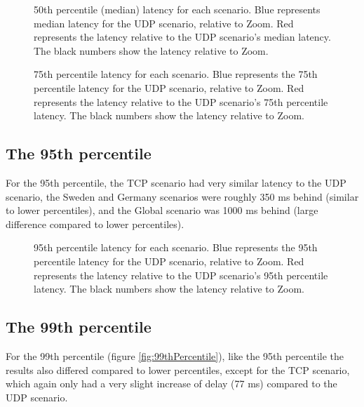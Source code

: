 \documentclass{kththesis}
\begin{document}
\begin{figure}[!htb]
    \centering
    
    \caption{50th percentile (median) latency for each scenario. Blue represents median latency for the UDP scenario, relative to Zoom. Red represents the latency relative to the UDP scenario's median latency. The black numbers show the latency relative to Zoom.}
    \label{fig:50thPercentile}
\end{figure}

\begin{figure}[!htb]
    \centering
    
    \caption{75th percentile latency for each scenario. Blue represents the 75th percentile latency for the UDP scenario, relative to Zoom. Red represents the latency relative to the UDP scenario's 75th percentile latency. The black numbers show the latency relative to Zoom.}
    \label{fig:75thPercentile}
\end{figure}

\subsection{The 95th percentile}
For the 95th percentile, the TCP scenario had very similar latency to the UDP scenario, the Sweden and Germany scenarios were roughly 350 ms behind (similar to lower percentiles), and the Global scenario was 1000 ms behind (large difference compared to lower percentiles).

\begin{figure}[!htb]
    \centering
    
    \caption{95th percentile latency for each scenario. Blue represents the 95th percentile latency for the UDP scenario, relative to Zoom. Red represents the latency relative to the UDP scenario's 95th percentile latency. The black numbers show the latency relative to Zoom.}
    \label{fig:95thPercentile}
\end{figure}

\subsection{The 99th percentile}
For the 99th percentile (figure \ref{fig:99thPercentile}), like the 95th percentile the results also differed compared to lower percentiles, except for the TCP scenario, which again only had a very slight increase of delay (77 ms) compared to the UDP scenario. 
\end{document}
